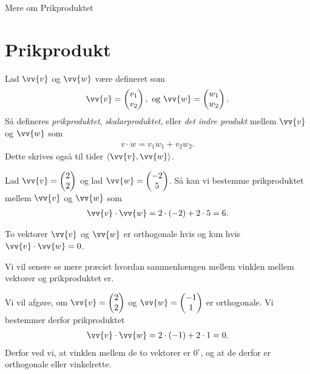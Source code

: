 
\begin{center}
\Huge
Mere om Prikproduktet
\end{center}

\section*{Prikprodukt}

\begin{defn}
Lad $\vv{v}$ og $\vv{w}$ være defineret som
\begin{align*}
\vv{v} = \begin{pmatrix}
v_1\\ v_2
\end{pmatrix}, \textnormal{ og }\vv{w} = \begin{pmatrix}w_1 \\ w_2
\end{pmatrix}.
\end{align*}
Så defineres \textit{prikproduktet}, \textit{skalarproduktet}, eller \textit{det indre produkt}  mellem $\vv{v}$ og $\vv{w}$ som
\begin{align*}
v\cdot w = v_1w_1 + v_2w_2.
\end{align*}
Dette skrives også til tider $\langle \vv{v}, \vv{w} \rangle$. 
\end{defn}
\begin{exa}
Lad $\vv{v} = \begin{pmatrix}
2 \\ 2
\end{pmatrix}$ og lad $\vv{w} = \begin{pmatrix}
-2 \\ 5
\end{pmatrix}$. Så kan vi bestemme prikproduktet mellem $\vv{v}$ og $\vv{w}$ som
\begin{align*}
\vv{v} \cdot \vv{w} = 2\cdot(-2)+2\cdot 5 = 6.
\end{align*}
\end{exa}

\begin{setn}
To vektorer $\vv{v}$ og $\vv{w}$ er orthogonale hvis og kun hvis $\vv{v}\cdot \vv{w} = 0$.
\end{setn}
Vi vil senere se mere præcist hvordan sammenhængen mellem vinklen mellem vektorer og prikproduktet er. 
\begin{exa}
Vi vil afgøre, om $\vv{v} = \begin{pmatrix}
2\\2
\end{pmatrix}$ og $\vv{w} = \begin{pmatrix}
-1\\1
\end{pmatrix}$ er orthogonale. Vi bestemmer derfor prikproduktet
\begin{align*}
\vv{v}\cdot \vv{w} = 2\cdot(-1)+2\cdot 1 = 0. 
\end{align*}
Derfor ved vi, at vinklen mellem de to vektorer er $0^\circ$, og at de derfor er orthogonale eller vinkelrette.
\end{exa}

